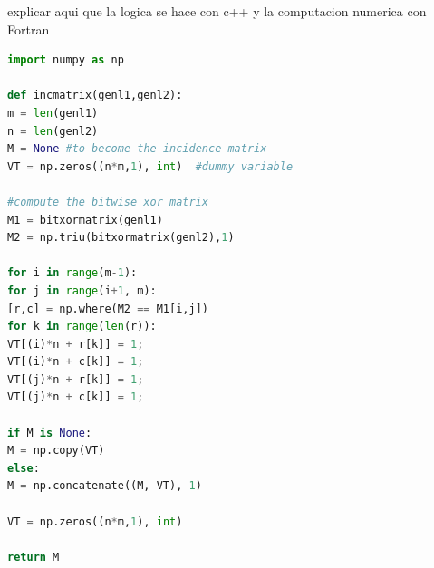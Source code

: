 explicar aqui que la logica se hace con c++ y la computacion numerica con Fortran

\begin{lstlisting}[language=Python, caption=Python example]
import numpy as np

def incmatrix(genl1,genl2):
m = len(genl1)
n = len(genl2)
M = None #to become the incidence matrix
VT = np.zeros((n*m,1), int)  #dummy variable

#compute the bitwise xor matrix
M1 = bitxormatrix(genl1)
M2 = np.triu(bitxormatrix(genl2),1) 

for i in range(m-1):
for j in range(i+1, m):
[r,c] = np.where(M2 == M1[i,j])
for k in range(len(r)):
VT[(i)*n + r[k]] = 1;
VT[(i)*n + c[k]] = 1;
VT[(j)*n + r[k]] = 1;
VT[(j)*n + c[k]] = 1;

if M is None:
M = np.copy(VT)
else:
M = np.concatenate((M, VT), 1)

VT = np.zeros((n*m,1), int)

return M
\end{lstlisting}